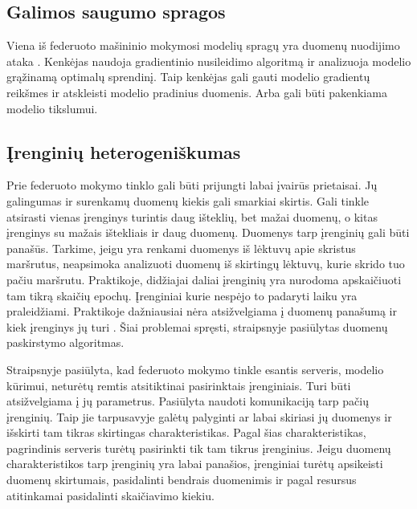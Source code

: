 \documentclass{VUMIFInfBakalaurinis}
\begin{document}
\subsection{Galimos saugumo spragos}
\par Viena iš federuoto mašininio mokymosi modelių spragų yra duomenų nuodijimo ataka \cite{19}. Kenkėjas naudoja gradientinio nusileidimo algoritmą ir analizuoja modelio grąžinamą optimalų sprendinį. Taip kenkėjas gali gauti modelio gradientų reikšmes ir atskleisti modelio pradinius duomenis. Arba gali būti pakenkiama modelio tikslumui.


\subsection{Įrenginių heterogeniškumas}
\par Prie federuoto mokymo tinklo gali būti prijungti labai įvairūs prietaisai. Jų galingumas ir surenkamų duomenų kiekis gali smarkiai skirtis. Gali tinkle atsirasti vienas įrenginys turintis daug išteklių, bet mažai duomenų, o kitas įrenginys su mažais ištekliais ir daug duomenų. Duomenys tarp įrenginių gali būti panašūs. Tarkime, jeigu yra renkami duomenys iš lėktuvų apie skristus maršrutus, neapsimoka analizuoti duomenų iš skirtingų lėktuvų, kurie skrido tuo pačiu maršrutu. Praktikoje, didžiajai daliai įrenginių yra nurodoma apskaičiuoti tam tikrą skaičių epochų. Įrenginiai kurie nespėjo to padaryti laiku yra praleidžiami. Praktikoje dažniausiai nėra atsižvelgiama į duomenų panašumą ir kiek įrenginys jų turi \cite{20}. Šiai problemai spręsti, straipsnyje \cite{21} pasiūlytas duomenų paskirstymo algoritmas. %
\par Straipsnyje \cite{20} pasiūlyta, kad federuoto mokymo tinkle esantis serveris, modelio kūrimui, neturėtų remtis atsitiktinai pasirinktais įrenginiais. Turi būti atsižvelgiama į jų parametrus. Pasiūlyta naudoti komunikaciją tarp pačių įrenginių. Taip jie tarpusavyje galėtų palyginti ar labai skiriasi jų duomenys ir išskirti tam tikras skirtingas charakteristikas. Pagal šias charakteristikas, pagrindinis serveris turėtų pasirinkti tik tam tikrus įrenginius. Jeigu duomenų charakteristikos tarp įrenginių yra labai panašios, įrenginiai turėtų apsikeisti duomenų skirtumais, pasidalinti bendrais duomenimis ir pagal resursus atitinkamai pasidalinti skaičiavimo kiekiu. 
\end{document}
